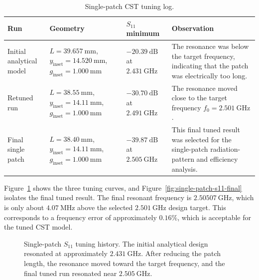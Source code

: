 \begin{table}[H]
\centering
\caption{Single-patch CST tuning log.}
\label{tab:single-patch-tuning-log}
\footnotesize
\setlength{\tabcolsep}{4pt}
\renewcommand{\arraystretch}{1.25}

\begin{tabularx}{\textwidth}{@{}
>{\raggedright\arraybackslash}p{}
>{\raggedright\arraybackslash}p{}
>{\raggedright\arraybackslash}p{}
>{\raggedright\arraybackslash}X
@{}}
\toprule
\textbf{Run} &
\textbf{Geometry} &
\textbf{\(S_{11}\) minimum} &
\textbf{Observation} \\
\midrule

Initial analytical model &
\(L=39.657~\mathrm{mm}\),
\(y_{\mathrm{inset}}=14.520~\mathrm{mm}\),
\(g_{\mathrm{inset}}=1.000~\mathrm{mm}\) &
\(-20.39~\mathrm{dB}\) at \(2.431~\mathrm{GHz}\) &
The resonance was below the target frequency, indicating that the patch was electrically too long. \\

Retuned run &
\(L=38.55~\mathrm{mm}\),
\(y_{\mathrm{inset}}=14.11~\mathrm{mm}\),
\(g_{\mathrm{inset}}=1.000~\mathrm{mm}\) &
\(-30.70~\mathrm{dB}\) at \(2.491~\mathrm{GHz}\) &
The resonance moved close to the target frequency \(f_0=2.501~\mathrm{GHz}\). \\

Final single patch &
\(L=38.40~\mathrm{mm}\),
\(y_{\mathrm{inset}}=14.11~\mathrm{mm}\),
\(g_{\mathrm{inset}}=1.000~\mathrm{mm}\) &
\(-39.87~\mathrm{dB}\) at \(2.505~\mathrm{GHz}\) &
This final tuned result was selected for the single-patch radiation-pattern and efficiency analysis. \\

\bottomrule
\end{tabularx}
\end{table}

Figure~\ref{fig:single-patch-s11-tuning} shows the three tuning curves, and
Figure~\ref{fig:single-patch-s11-final} isolates the final tuned result.  The final resonant frequency is
\(2.50507~\mathrm{GHz}\), which is only about \(4.07~\mathrm{MHz}\) above the selected
\(2.501~\mathrm{GHz}\) design target.  This corresponds to a frequency error of approximately
\(0.16\%\), which is acceptable for the tuned CST model.

\begin{figure}[H]
    \centering
    \caption{Single-patch \(S_{11}\) tuning history.  The initial analytical design resonated at approximately \(2.431~\mathrm{GHz}\).  After reducing the patch length, the resonance moved toward the target frequency, and the final tuned run resonated near \(2.505~\mathrm{GHz}\).}
    \label{fig:single-patch-s11-tuning}
\end{figure}

